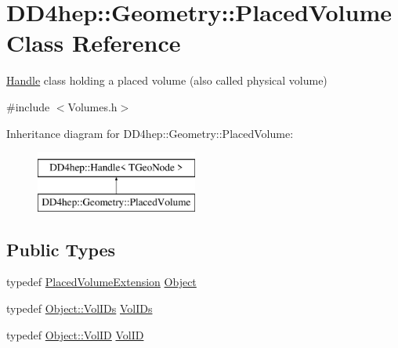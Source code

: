 \hypertarget{class_d_d4hep_1_1_geometry_1_1_placed_volume}{}\section{D\+D4hep\+:\+:Geometry\+:\+:Placed\+Volume Class Reference}
\label{class_d_d4hep_1_1_geometry_1_1_placed_volume}


\hyperlink{class_d_d4hep_1_1_handle}{Handle} class holding a placed volume (also called physical volume)  




{\ttfamily \#include $<$Volumes.\+h$>$}

Inheritance diagram for D\+D4hep\+:\+:Geometry\+:\+:Placed\+Volume\+:\begin{figure}[H]
\begin{center}
\leavevmode
\includegraphics[height=2.000000cm]{class_d_d4hep_1_1_geometry_1_1_placed_volume}
\end{center}
\end{figure}
\subsection*{Public Types}
\begin{DoxyCompactItemize}
\item 
typedef \hyperlink{class_d_d4hep_1_1_geometry_1_1_placed_volume_extension}{Placed\+Volume\+Extension} \hyperlink{class_d_d4hep_1_1_geometry_1_1_placed_volume_a9ae505098ca6976164b959e1d8b4bbb0}{Object}
\item 
typedef \hyperlink{class_d_d4hep_1_1_geometry_1_1_placed_volume_extension_1_1_vol_i_ds}{Object\+::\+Vol\+I\+Ds} \hyperlink{class_d_d4hep_1_1_geometry_1_1_placed_volume_a4383991fbc94adc2997ef98c9d30d9a6}{Vol\+I\+Ds}
\item 
typedef \hyperlink{class_d_d4hep_1_1_geometry_1_1_placed_volume_extension_a9f0e95dedfbda206b118af985b2ed473}{Object\+::\+Vol\+ID} \hyperlink{class_d_d4hep_1_1_geometry_1_1_placed_volume_aaecde4f8feb863af7cd36c1213bfabe4}{Vol\+ID}
\end{DoxyCompactItemize}
